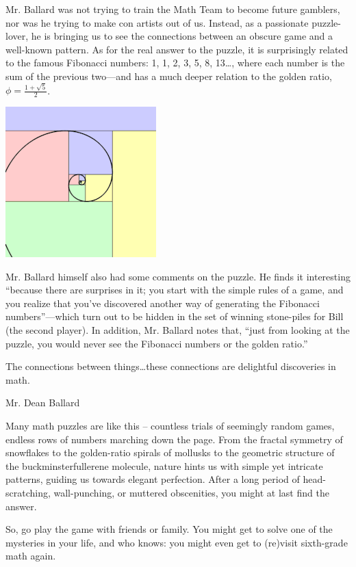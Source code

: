 \documentclass{article}
\begin{document}
Mr. Ballard was not trying to train the Math Team to become future gamblers, nor was he trying to make con artists out of us. Instead, as a passionate puzzle-lover, he is bringing us to see the connections between an obscure game and a well-known pattern.
As for the real answer to the puzzle, it is surprisingly related to the famous Fibonacci numbers: 1, 1, 2, 3, 5, 8, 13…, where each number is the sum of the previous two—and has a much deeper relation to the golden ratio, $\phi = \frac{1+\sqrt{5}}2$.
\begin{center}
    \includegraphics[scale=0.45]{images/fibonacci_seq.png}
\end{center}

Mr. Ballard himself also had some comments on the puzzle. He finds it interesting “because there are surprises in it; you start with the simple rules of a game, and you realize that you’ve discovered another way of generating the Fibonacci numbers”—which turn out to be hidden in the set of winning stone-piles for Bill (the second player). In addition, Mr. Ballard notes that, “just from looking at the puzzle, you would never see the Fibonacci numbers or the golden ratio.”

\epigraph{The connections between things…these connections are delightful discoveries in math.}{Mr. Dean Ballard}

Many math puzzles are like this – countless trials of seemingly random games, endless rows of numbers marching down the page. From the fractal symmetry of snowflakes to the golden-ratio spirals of mollusks to the geometric structure of the buckminsterfullerene molecule, nature hints us with simple yet intricate patterns, guiding us towards elegant perfection. After a long period of head-scratching, wall-punching, or muttered obscenities, you might at last find the answer.


So, go play the game with friends or family. You might get to solve one of the mysteries in your life, and who knows: you might even get to (re)visit sixth-grade math again.
\end{document}
